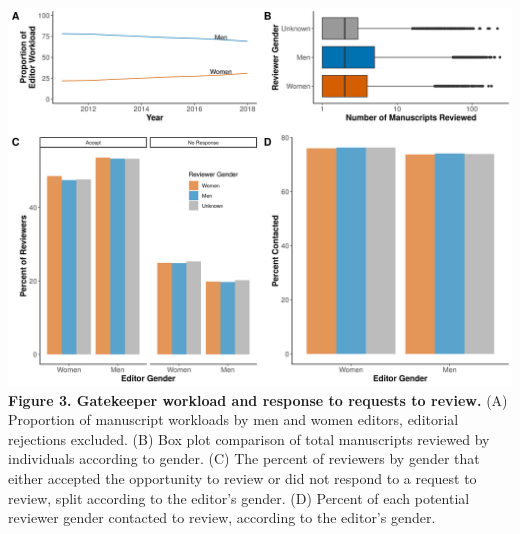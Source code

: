 \documentclass[11pt,]{article}
\begin{document}
\newpage

\includegraphics{Figure_2.png} \textbf{Figure 3. Gatekeeper workload and
response to requests to review.} (A) Proportion of manuscript workloads
by men and women editors, editorial rejections excluded. (B) Box plot
comparison of total manuscripts reviewed by individuals according to
gender. (C) The percent of reviewers by gender that either accepted the
opportunity to review or did not respond to a request to review, split
according to the editor's gender. (D) Percent of each potential reviewer
gender contacted to review, according to the editor's gender.

\newpage
\end{document}
